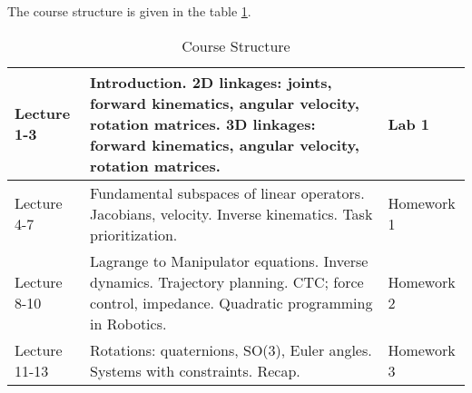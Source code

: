 
The course structure is given in the table \ref{t:course_structure}.



\begin{table}[h]
	\caption{Course Structure}
	\label{t:course_structure}
\begin{tabular}{p{25mm}|p{100mm}|p{30mm}}
  \hline
Lecture 1-3	& 
Introduction. \newline %
2D linkages: joints, forward kinematics, angular velocity, rotation matrices. \newline %
3D linkages: forward kinematics, angular velocity, rotation matrices. \newline %
&	
Lab 1  
\\   \hline
%
Lecture 4-7 &
Fundamental subspaces of linear operators. \newline %
Jacobians, velocity. \newline %
Inverse kinematics. \newline %
Task prioritization.  \newline %
& 
Homework 1  
\\   \hline
%
Lecture 8-10	& 
Lagrange to Manipulator equations. \newline %
Inverse dynamics. Trajectory planning. \newline %
CTC; force control, impedance.  \newline %
Quadratic programming in Robotics. \newline %
& 
Homework 2 
\\   \hline
%
Lecture 11-13	& 
Rotations: quaternions, SO(3), Euler angles.  \newline %
Systems with constraints.  \newline %
Recap.  \newline %
& 
Homework 3
\\  \hline
\end{tabular}
\end{table}